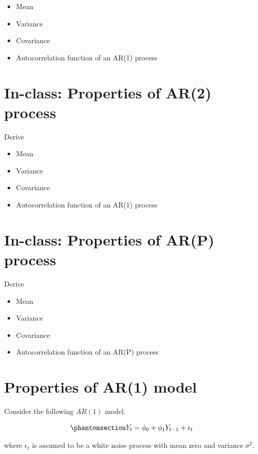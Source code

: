 \documentclass[
  11pt,
  a4paper,
]{report}
\begin{document}
\begin{itemize}
\item
  Mean
\item
  Variance
\item
  Covariance
\item
  Autocorrelation function of an AR(1) process
\end{itemize}

\section{In-class: Properties of AR(2)
process}\label{in-class-properties-of-ar2-process}

Derive

\begin{itemize}
\item
  Mean
\item
  Variance
\item
  Covariance
\item
  Autocorrelation function of an AR(1) process
\end{itemize}

\section{In-class: Properties of AR(P)
process}\label{in-class-properties-of-arp-process}

Derive

\begin{itemize}
\item
  Mean
\item
  Variance
\item
  Covariance
\item
  Autocorrelation function of an AR(P) process
\end{itemize}

\section{Properties of AR(1) model}\label{properties-of-ar1-model}

Consider the following \(AR(1)\) model.

\begin{equation}\phantomsection\label{eq-ar}{
Y_t=\phi_0+\phi_1Y_{t-1}+\epsilon_{t}
}\end{equation}

where \({\epsilon_t}\) is assumed to be a white noise process with mean
zero and variance \(\sigma^2\).
\end{document}
